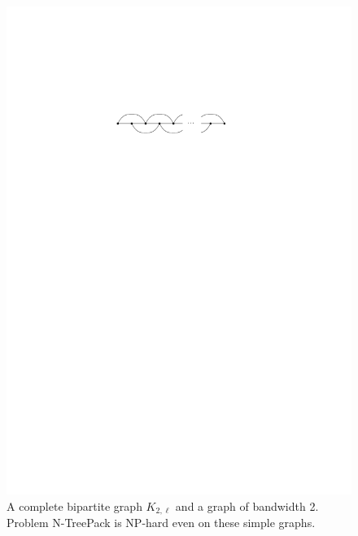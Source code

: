\documentclass[runningheads]{llncs}
\newcommand{\xxxNTP}{{\sc N-TreePack}}
\newcommand{\lasse}[1]{#1}
\begin{document}
\begin{figure}[htpb]
\includegraphics[scale=1]{bandwidth_2}
\caption{\lasse{A complete bipartite graph $K_{2,\ell}$ and a graph of bandwidth 2. Problem {\xxxNTP} is NP-hard even on these simple graphs.} }
\label{fig_easy_graphs}
\end{figure}
\end{document}
